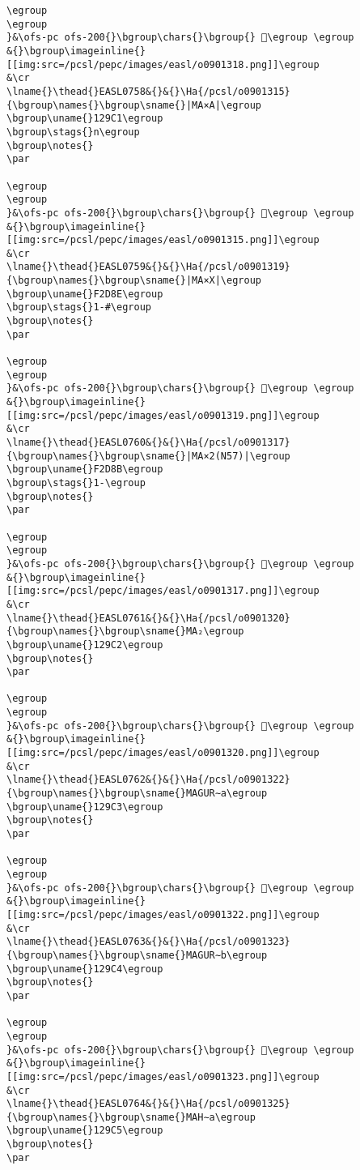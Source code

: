 \begin{verbatim}
\egroup
\egroup
}&\ofs-pc ofs-200{}\bgroup\chars{}\bgroup{} 𒦿\egroup \egroup
&{}\bgroup\imageinline{}[[img:src=/pcsl/pepc/images/easl/o0901318.png]]\egroup
&\cr
\lname{}\thead{}EASL0758&{}&{}\Ha{/pcsl/o0901315}{\bgroup\names{}\bgroup\sname{}|MA×A|\egroup
\bgroup\uname{}129C1\egroup
\bgroup\stags{}n\egroup
\bgroup\notes{}
\par 

\egroup
\egroup
}&\ofs-pc ofs-200{}\bgroup\chars{}\bgroup{} 𒧁\egroup \egroup
&{}\bgroup\imageinline{}[[img:src=/pcsl/pepc/images/easl/o0901315.png]]\egroup
&\cr
\lname{}\thead{}EASL0759&{}&{}\Ha{/pcsl/o0901319}{\bgroup\names{}\bgroup\sname{}|MA×X|\egroup
\bgroup\uname{}F2D8E\egroup
\bgroup\stags{}1-#\egroup
\bgroup\notes{}
\par 

\egroup
\egroup
}&\ofs-pc ofs-200{}\bgroup\chars{}\bgroup{} 󲶎\egroup \egroup
&{}\bgroup\imageinline{}[[img:src=/pcsl/pepc/images/easl/o0901319.png]]\egroup
&\cr
\lname{}\thead{}EASL0760&{}&{}\Ha{/pcsl/o0901317}{\bgroup\names{}\bgroup\sname{}|MA×2(N57)|\egroup
\bgroup\uname{}F2D8B\egroup
\bgroup\stags{}1-\egroup
\bgroup\notes{}
\par 

\egroup
\egroup
}&\ofs-pc ofs-200{}\bgroup\chars{}\bgroup{} 󲶋\egroup \egroup
&{}\bgroup\imageinline{}[[img:src=/pcsl/pepc/images/easl/o0901317.png]]\egroup
&\cr
\lname{}\thead{}EASL0761&{}&{}\Ha{/pcsl/o0901320}{\bgroup\names{}\bgroup\sname{}MA₂\egroup
\bgroup\uname{}129C2\egroup
\bgroup\notes{}
\par 

\egroup
\egroup
}&\ofs-pc ofs-200{}\bgroup\chars{}\bgroup{} 𒧂\egroup \egroup
&{}\bgroup\imageinline{}[[img:src=/pcsl/pepc/images/easl/o0901320.png]]\egroup
&\cr
\lname{}\thead{}EASL0762&{}&{}\Ha{/pcsl/o0901322}{\bgroup\names{}\bgroup\sname{}MAGUR∼a\egroup
\bgroup\uname{}129C3\egroup
\bgroup\notes{}
\par 

\egroup
\egroup
}&\ofs-pc ofs-200{}\bgroup\chars{}\bgroup{} 𒧃\egroup \egroup
&{}\bgroup\imageinline{}[[img:src=/pcsl/pepc/images/easl/o0901322.png]]\egroup
&\cr
\lname{}\thead{}EASL0763&{}&{}\Ha{/pcsl/o0901323}{\bgroup\names{}\bgroup\sname{}MAGUR∼b\egroup
\bgroup\uname{}129C4\egroup
\bgroup\notes{}
\par 

\egroup
\egroup
}&\ofs-pc ofs-200{}\bgroup\chars{}\bgroup{} 𒧄\egroup \egroup
&{}\bgroup\imageinline{}[[img:src=/pcsl/pepc/images/easl/o0901323.png]]\egroup
&\cr
\lname{}\thead{}EASL0764&{}&{}\Ha{/pcsl/o0901325}{\bgroup\names{}\bgroup\sname{}MAH∼a\egroup
\bgroup\uname{}129C5\egroup
\bgroup\notes{}
\par 


\end{verbatim}

